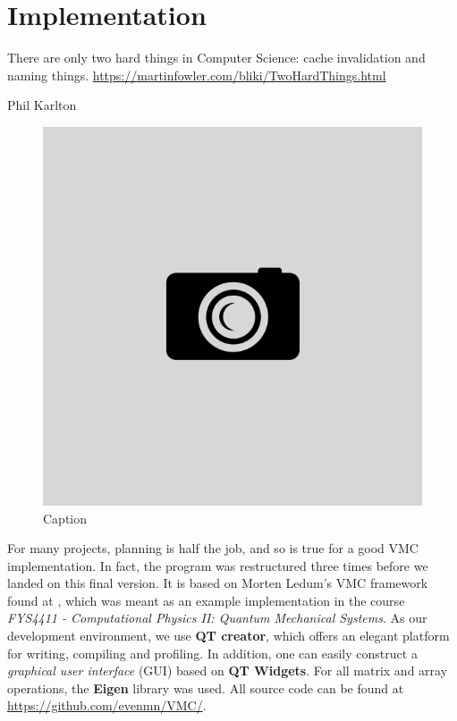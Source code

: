 \chapter{Implementation} \label{sec:implementation}
\epigraph{There are only two hard things in Computer Science: cache invalidation and naming things. \url{https://martinfowler.com/bliki/TwoHardThings.html}}{Phil Karlton}
\begin{figure}[H]
	\centering
	\includegraphics[scale=0.4]{Images/example.png}
	\caption{Caption}
\end{figure}

For many projects, planning is half the job, and so is true for a good VMC implementation. In fact, the program was restructured three times before we landed on this final version. It is based on Morten Ledum's VMC framework found at \cite{ledum_simple_2016}, which was meant as an example implementation in the course \textit{FYS4411 - Computational Physics II: Quantum Mechanical Systems}. As our development environment, we use \textbf{QT creator}, which offers an elegant platform for writing, compiling and profiling. In addition, one can easily construct a \textit{graphical user interface} (GUI) based on \textbf{QT Widgets}. For all matrix and array operations, the \textbf{Eigen} library was used. All source code can be found at \url{https://github.com/evenmn/VMC/}. \bigskip

